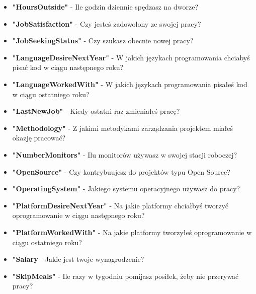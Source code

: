 \begin{appendices}
\begin{itemize}
        \item \textbf{"HoursOutside"} - Ile godzin dziennie spędzasz na dworze?
        \item \textbf{"JobSatisfaction"} - Czy jesteś zadowolony ze swojej pracy?
        \item \textbf{"JobSeekingStatus"} - Czy szukasz obecnie nowej pracy?
        \item \textbf{"LanguageDesireNextYear"} - W jakich językach programowania chciabyś pisać kod w ciągu następnego roku?
        \item \textbf{"LanguageWorkedWith"} - W jakich językach programowania pisałeś kod w ciągu ostatniego roku?
        \item \textbf{"LastNewJob"} - Kiedy ostatni raz zmieniałeś pracę?
        \item \textbf{"Methodology"} - Z jakimi metodykami zarządzania projektem miałeś okazję pracować?
        \item \textbf{"NumberMonitors"} - Ilu monitorów używasz w swojej stacji roboczej?
        \item \textbf{"OpenSource"} - Czy kontrybuujesz do projektów typu Open Source?
        \item \textbf{"OperatingSystem"} - Jakiego systemu operacyjnego używasz do pracy?
        \item \textbf{"PlatformDesireNextYear"} - Na jakie platformy chciałbyś tworzyć oprogramowanie w ciągu następnego roku?
        \item \textbf{"PlatformWorkedWith"} - Na jakie platformy tworzyłeś oprogramowanie w ciągu ostatniego roku?
        \item \textbf{"Salary} - Jakie jest twoje wynagrodzenie?
        \item \textbf{"SkipMeals"} - Ile razy w tygodniu pomijasz posiłek, żeby nie przerywać pracy?

\end{itemize}
\end{appendices}
